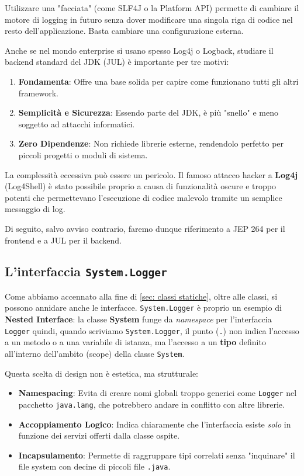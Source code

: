 \medskip

Utilizzare una "facciata" (come SLF4J o la Platform API) permette di cambiare il motore di logging in futuro senza dover modificare una singola riga di codice nel resto dell'applicazione. Basta cambiare una configurazione esterna.

Anche se nel mondo enterprise si usano spesso Log4j o Logback, studiare il backend standard del JDK (JUL) è importante per tre motivi:
\begin{enumerate}
    \item \textbf{Fondamenta}: Offre una base solida per capire come funzionano tutti gli altri framework.
    \item \textbf{Semplicità e Sicurezza}: Essendo parte del JDK, è più "snello" e meno soggetto ad attacchi informatici. 
    \item \textbf{Zero Dipendenze}: Non richiede librerie esterne, rendendolo perfetto per piccoli progetti o moduli di sistema.
\end{enumerate} 

\begin{warningbox}
La complessità eccessiva può essere un pericolo. Il famoso attacco hacker a \textbf{Log4j} (Log4Shell) è stato possibile proprio a causa di funzionalità oscure e troppo potenti che permettevano l'esecuzione di codice malevolo tramite un semplice messaggio di log.
\end{warningbox}

Di seguito, salvo avviso contrario, faremo dunque riferimento a JEP 264 per il frontend e a JUL per il backend.

\subsection{L'interfaccia \texttt{System.Logger}}
Come abbiamo accennato alla fine di \ref{sec: classi statiche}, oltre alle classi, si possono annidare anche le interfacce. \texttt{System.Logger} è proprio un esempio di \textbf{Nested Interface}: la classe \textbf{System} funge da \textit{namespace} per l'interfaccia \texttt{Logger} quindi, quando scriviamo \texttt{System.Logger}, il punto (\texttt{.}) non indica l'accesso a un metodo o a una variabile di istanza, ma l'accesso a un \textbf{tipo} definito all'interno dell'ambito (scope) della classe \texttt{System}.

Questa scelta di design non è estetica, ma strutturale:
\begin{itemize}
    \item \textbf{Namespacing}: Evita di creare nomi globali troppo generici come \texttt{Logger} nel pacchetto \texttt{java.lang}, che potrebbero andare in conflitto con altre librerie.
    \item \textbf{Accoppiamento Logico}: Indica chiaramente che l'interfaccia esiste \textit{solo} in funzione dei servizi offerti dalla classe ospite.
    \item \textbf{Incapsulamento}: Permette di raggruppare tipi correlati senza "inquinare" il file system con decine di piccoli file \texttt{.java}.
\end{itemize}

